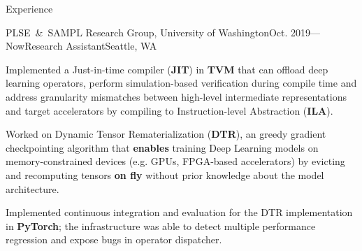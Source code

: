 \documentclass{resume}
\begin{document}
	\begin{rSection}{Experience}



		\begin{rSubsection}{PLSE\ \&\ SAMPL Research Group, University of Washington}{Oct. 2019---Now}{Research Assistant}{Seattle, WA} 
			\item Implemented a Just-in-time compiler (\textbf{JIT}) in \textbf{TVM} that can offload deep learning operators, perform simulation-based verification during compile time and address granularity mismatches between high-level intermediate representations and target accelerators by compiling to Instruction-level Abstraction (\textbf{ILA}).
			\item Worked on Dynamic Tensor Rematerialization (\textbf{DTR}), an greedy gradient checkpointing algorithm that \textbf{enables} training Deep Learning models on memory-constrained devices (e.g. GPUs, FPGA-based accelerators) by evicting and recomputing tensors \textbf{on fly} without prior knowledge about the model architecture. \item Implemented continuous integration and evaluation for the DTR implementation in \textbf{PyTorch}; the infrastructure was able to detect multiple performance regression and expose bugs in operator dispatcher.
		\end{rSubsection}


\end{rSection}
\end{document}
